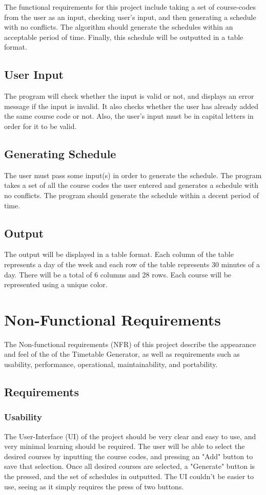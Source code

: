 \documentclass[12pt]{article}
\begin{document}
\tab The functional requirements for this project include taking a set of course-codes from the user as an input, checking user's input, and then generating a schedule with no conflicts. The algorithm should generate the schedules within an acceptable period of time. Finally, this schedule will be outputted in a table format.

\subsection{User Input}

\tab The program will check whether the input is valid or not, and displays an error message if the input is invalid. It also checks whether the user has already added the same course code or not. Also, the user's input must be in capital letters in order for it to be valid.
\
\subsection{Generating Schedule}
\tab The user must pass some input(s) in order to generate the schedule. The program takes a set of all the course codes the user entered and generates a schedule with no conflicts. The program should generate the schedule within a decent period of time. 

\subsection{Output}
\tab The output will be displayed in a table format. Each column of the table represents a day of the week and each row of the table represents 30 minutes of a day. There will be a total of 6 columns and 28 rows. Each course will be represented using a unique color.

\newpage
\section{Non-Functional Requirements}
\tab The Non-functional requirements (NFR) of this project describe the appearance and feel of the of the Timetable Generator, as well as requirements such as usability, performance, operational, maintainability, and portability.

\subsection{Requirements}
\subsubsection{Usability}
\tab The User-Interface (UI) of the project should be very clear and easy to use, and very minimal learning should be required. The user will be able to select the desired courses by inputting the course codes, and pressing an "Add" button to save that selection. Once all desired courses are selected, a "Generate" button is the pressed, and the set of schedules in outputted. The UI couldn't be easier to use, seeing as it simply requires the press of two buttons.
\end{document}
